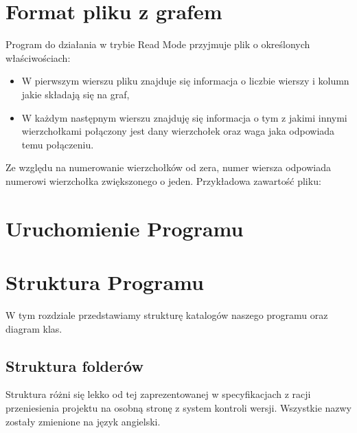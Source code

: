 \documentclass[10pt, a4paper]{report}
\begin{document}
\section{Format pliku z grafem}
Program do działania w trybie Read Mode przyjmuje plik o określonych właściwościach:
    \begin{itemize}
        \item W pierwszym wierszu pliku znajduje się informacja o liczbie wierszy i kolumn jakie składają się na graf,
        \item W każdym następnym wierszu znajduję się informacja o tym z jakimi innymi wierzchołkami połączony jest dany wierzchołek oraz waga jaka odpowiada temu połączeniu.
    \end{itemize}
    Ze względu na numerowanie wierzchołków od zera, numer wiersza odpowiada numerowi wierzchołka zwiększonego o jeden. 
    Przykładowa zawartość pliku:
    

\section{Uruchomienie Programu}

\section{Struktura Programu}
W tym rozdziale przedstawiamy strukturę katalogów naszego programu oraz diagram klas.

\subsection{Struktura folderów}
Struktura różni się lekko od tej zaprezentowanej w specyfikacjach z racji przeniesienia projektu na osobną stronę
z system kontroli wersji. Wszystkie nazwy zostały zmienione na język angielski.
\end{document}
